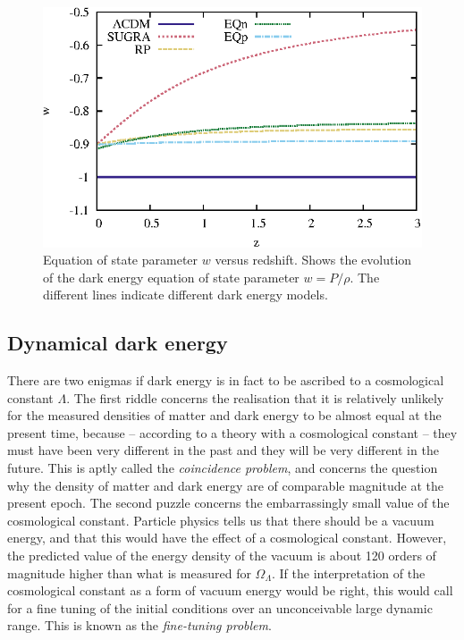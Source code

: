 \begin{figure}
\includegraphics[width=\textwidth]{ch_voidsde/img/wvsz}
\caption{Equation of state parameter $w$ versus redshift. Shows the evolution of the dark energy equation of state parameter $w = P/\rho$. The different lines indicate different dark energy models.}
\label{fig:wvsz}
\end{figure}

\subsection{Dynamical dark energy}
\label{sec:dynDE}
There are two enigmas if dark energy is in fact to be ascribed to a cosmological constant $\Lambda$. The first riddle concerns 
the realisation that it is relatively unlikely for the measured densities of matter and dark energy to be almost equal at the 
present time, because -- according to a theory with a cosmological constant -- they must have been very different in the past 
and they will be very different in the future. This is aptly called the 
\textit{coincidence problem}, and concerns the question why the density of matter and dark energy are of comparable magnitude at the present 
epoch. The second puzzle concerns the embarrassingly small value of the cosmological constant. 
Particle physics tells us that there should be a vacuum energy, and that this would have the effect of a cosmological constant. However, the 
predicted value of the energy density of the vacuum is about 120 orders of magnitude higher than what is measured for $\Omega_\Lambda$.
If the interpretation of the cosmological constant as a form of vacuum energy would be right, this would call for a fine 
tuning of the initial conditions over an unconceivable large dynamic range. This is known as the \textit{fine-tuning problem}.


